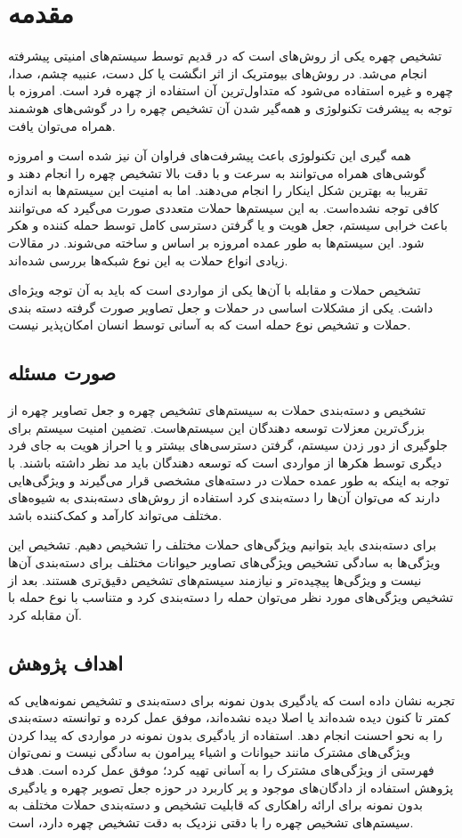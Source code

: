 \chapter{مقدمه}
\label{chap:introduction}
تشخیص چهره یکی از روش‌های
است که در قدیم توسط سیستم‌های امنیتی پیشرفته انجام می‌شد. در روش‌های بیومتریک از اثر انگشت یا کل دست، عنبیه چشم، صدا، چهره و غیره استفاده می‌شود که متداول‌ترین آن استفاده از چهره فرد است. امروزه با توجه به پیشرفت تکنولوژی و همه‌گیر شدن آن تشخیص چهره را در گوشی‌های هوشمند همراه می‌توان یافت.

همه گیری این تکنولوژی باعث پیشرفت‌های فراوان آن نیز شده است و امروزه گوشی‌های همراه می‌توانند به سرعت و با دقت بالا تشخیص چهره را انجام دهند و تقریبا به بهترین شکل اینکار را انجام می‌دهند. اما به امنیت این سیستم‌ها به اندازه کافی توجه نشده‌است. به این سیستم‌ها حملات متعددی صورت می‌گیرد که می‌توانند باعث خرابی سیستم، جعل هویت و یا گرفتن دسترسی کامل توسط حمله کننده و هکر شود. این سیستم‌ها به طور عمده امروزه بر اساس
و
ساخته می‌شوند. در مقالات زیادی انواع حملات به این نوع شبکه‌ها بررسی شده‌اند.

تشخیص حملات و مقابله با آن‌ها یکی از مواردی است که باید به آن توجه ویژه‌ای داشت. یکی از مشکلات اساسی در حملات و جعل تصاویر صورت گرفته دسته بندی حملات و تشخیص نوع حمله است که به آسانی توسط انسان امکان‌پذیر نیست.
\section{صورت مسئله}
تشخیص و دسته‌بندی حملات به سیستم‌های تشخیص چهره و جعل‌ تصاویر چهره از بزرگ‌ترین معزلات توسعه دهندگان این سیستم‌هاست. تضمین امنیت سیستم برای جلوگیری از دور زدن سیستم، گرفتن دسترسی‌های بیشتر و یا احراز هویت به جای فرد دیگری توسط هکرها از مواردی است که  توسعه دهندگان باید مد نظر داشته باشند. با توجه به اینکه به طور عمده حملات در دسته‌های مشخصی قرار می‌گیرند و ویژگی‌هایی دارند که می‌توان آن‌ها را دسته‌بندی کرد استفاده از روش‌های دسته‌بندی به شیوه‌های مختلف می‌تواند کارآمد و کمک‌کننده باشد.

برای دسته‌بندی باید بتوانیم ویژگی‌های حملات مختلف را تشخیص دهیم. تشخیص این ویژگی‌ها به سادگی تشخیص ویژگی‌های تصاویر حیوانات مختلف برای دسته‌بندی آن‌ها نیست و ویژگی‌ها پیچیده‌تر و نیازمند سیستم‌های تشخیص دقیق‌تری هستند. بعد از تشخیص ویژگی‌های مورد نظر می‌توان حمله را دسته‌بندی کرد و متناسب با نوع حمله با آن مقابله کرد.

\section{اهداف پژوهش}
تجربه نشان داده است که یادگیری بدون نمونه برای دسته‌بندی و تشخیص نمونه‌هایی که کمتر تا کنون دیده شده‌اند یا اصلا دیده نشده‌اند، موفق عمل کرده و توانسته دسته‌بندی را به نحو احسنت انجام دهد. استفاده از یادگیری بدون نمونه در مواردی که پیدا کردن ویژگی‌های مشترک مانند حیوانات و اشیاء پیرامون به سادگی نیست و نمی‌توان فهرستی از ویژگی‌های مشترک را به آسانی تهیه کرد؛ موفق عمل کرده است. هدف پژوهش استفاده از دادگان‌های موجود و پر کاربرد در حوزه جعل تصویر چهره و یادگیری بدون نمونه برای ارائه راهکاری که قابلیت تشخیص و دسته‌بندی حملات مختلف به سیستم‌های تشخیص چهره را با دقتی نزدیک به دقت تشخیص چهره دارد، است.

